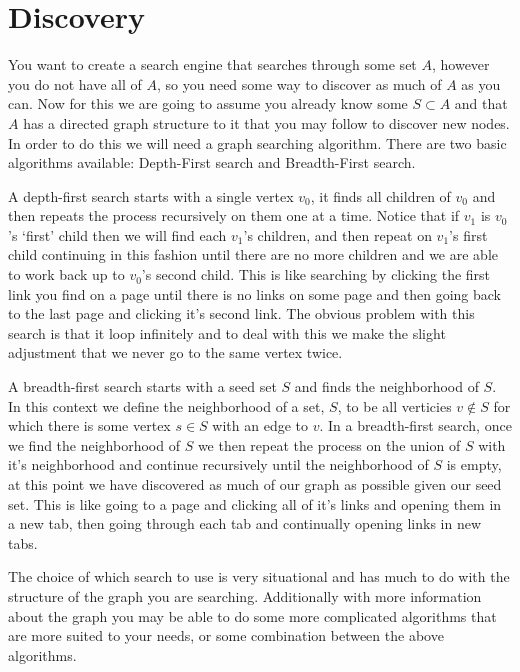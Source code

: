 \documentclass{article}
\begin{document}
	
	
	\section{Discovery}
	
	You want to create a search engine that searches through some set $A$, however you do not have all of $A$, so you need some way to discover as much of $A$ as you can. Now for this we are going to assume you already know some $S\subset A$ and that $A$ has a directed graph structure to it that you may follow to discover new nodes. In order to do this we will need a graph searching algorithm. There are two basic algorithms available: Depth-First search and Breadth-First search. 
	
	A depth-first search starts with a single vertex $v_0$, it finds all children of $v_0$ and then repeats the process recursively on them one at a time. Notice that if $v_1$ is $v_0$'s `first' child then we will find each $v_1$'s children, and then repeat on $v_1$'s first child continuing in this fashion until there are no more children and we are able to work back up to $v_0$'s second child. This is like searching by clicking the first link you find on a page until there is no links on some page and then going back to the last page and clicking it's second link. The obvious problem with this search is that it loop infinitely and to deal with this we make the slight adjustment that we never go to the same vertex twice. 
	
	A breadth-first search starts with a seed set $S$ and finds the neighborhood of $S$. In this context we define the neighborhood of a set, $S$, to be all verticies $v\not\in S$ for which there is some vertex $s\in S$ with an edge to $v$. In a breadth-first search, once we find the neighborhood of $S$ we then repeat the process on the union of $S$ with it's neighborhood and continue recursively until the neighborhood of $S$ is empty, at this point we have discovered as much of our graph as possible given our seed set. This is like going to a page and clicking all of it's links and opening them in a new tab, then going through each tab and continually opening links in new tabs.
	
	The choice of which search to use is very situational and has much to do with the structure of the graph you are searching. Additionally with more information about the graph you may be able to do some more complicated algorithms that are more suited to your needs, or some combination between the above algorithms.
	
\end{document}
